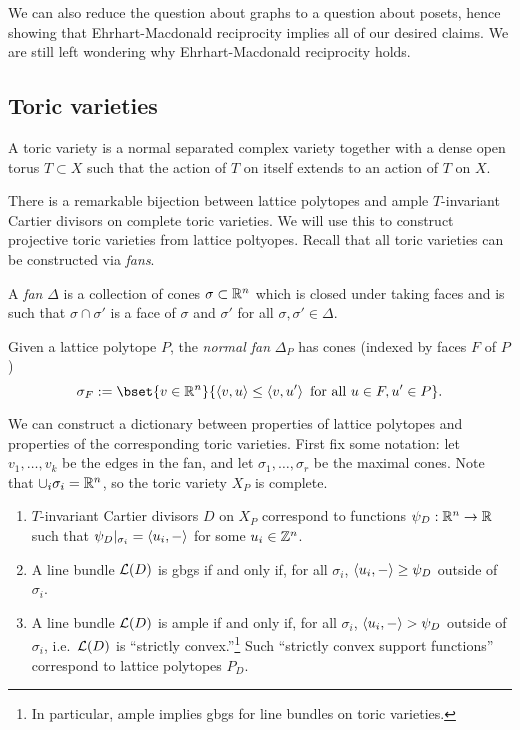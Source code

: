 \documentclass{article}
\begin{document}
We can also reduce the question about graphs to a question about posets, hence showing that Ehrhart-Macdonald reciprocity implies all of our desired claims.
We are still left wondering why Ehrhart-Macdonald reciprocity holds.

\subsection{Toric varieties}

\begin{dfn}
	A toric variety is a normal separated complex variety together with a dense open torus $T \subset X$ such that the action of $T$ on itself extends to an action of $T$ on $X$.
\end{dfn}

There is a remarkable bijection between lattice polytopes and ample $T$-invariant Cartier divisors on complete toric varieties.
We will use this to construct projective toric varieties from lattice poltyopes.
Recall that all toric varieties can be constructed via \emph{fans}.

\begin{dfn}
	A \emph{fan} $\Delta$ is a collection of cones $\sigma \subset \mathbb{R}^n$ which is closed under taking faces and is such that $\sigma \cap \sigma'$ is a face of $\sigma$ and $\sigma'$ for all $\sigma, \sigma' \in \Delta$.
\end{dfn}

\begin{dfn}
	Given a lattice polytope $P$, the \emph{normal fan} $\Delta_P$ has cones (indexed by faces $F$ of $P$)
	\[
		\sigma_F := \bset{v \in \RR^n}{\ip{v}{u} \leq \ip{v}{u'} \textrm{ for all } u \in F, u' \in P}.
	\]
\end{dfn}

We can construct a dictionary between properties of lattice polytopes and properties of the corresponding toric varieties.
First fix some notation: let $v_1, \dots, v_k$ be the edges in the fan, and let $\sigma_1, \dots, \sigma_r$ be the maximal cones.
Note that $\cup_i \sigma_i = \mathbb{R}^n$, so the toric variety $X_P$ is complete.

\begin{enumerate}
	\item $T$-invariant Cartier divisors $D$ on $X_P$ correspond to functions $\psi_D: \mathbb{R}^n \to \mathbb{R}$ such that $\psi_D|_{\sigma_i} = \left\langle {u_i}, {-} \right\rangle$ for some $u_i \in \mathbb{Z}^n$.
	\item A line bundle $\mathcal{L}(D)$ is gbgs if and only if, for all $\sigma_i$, $\left\langle {u_i}, {-} \right\rangle \geq \psi_D$ outside of $\sigma_i$.
	\item A line bundle $\mathcal{L}(D)$ is ample if and only if, for all $\sigma_i$, $\left\langle {u_i}, {-} \right\rangle > \psi_D$ outside of $\sigma_i$, i.e.\ $\mathcal{L}(D)$ is ``strictly convex.''\footnote{In particular, ample implies gbgs for line bundles on toric varieties.}
		Such ``strictly convex support functions'' correspond to lattice polytopes $P_D$.
\end{enumerate}
\end{document}
